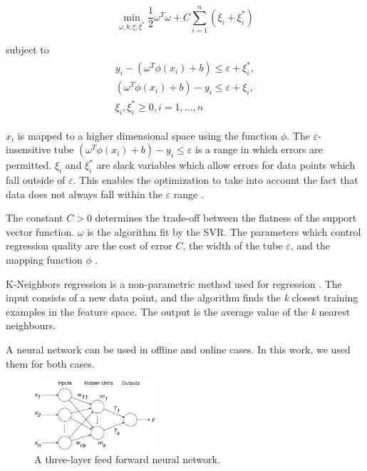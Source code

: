 \documentclass[final,3p,times,twocolumn,numbers]{elsarticle}
\begin{document}
\begin{equation}
\min_{\omega,b,\xi,\xi^{*}}\frac{1}{2}\omega^T\omega+C\sum_{i=1}^{n}(\xi_i+\xi_i^*)
\end{equation}

\noindent subject to
\begin{align}
\begin{multlined}
\label{svr:constrains}
y_i-(\omega^T\phi(x_i)+b)\leq\varepsilon+\xi_i^{*},\\
(\omega^T\phi(x_i)+b)-y_i\leq\varepsilon+\xi_i,\\
\xi_i,\xi^*_i\geq0,i=1,\ldots,n
\end{multlined}
\end{align}

\noindent $x_i$ is mapped to a higher dimensional space using the function $\phi$. The $\varepsilon$-insensitive tube $(\omega^T\phi(x_i)+b)-y_i\leq\varepsilon$ is a range in which errors are permitted. $\xi_i$ and $\xi^*_i$ are slack variables which allow errors for data points which fall outside of $\varepsilon$. This enables the optimization to take into account the fact that data does not always fall within the $\varepsilon$ range \cite{Smola2004}.

The constant $C>0$ determines the trade-off between the flatness of the support vector function. $\omega$ is the algorithm fit by the SVR. The parameters which control regression quality are the cost of error $C$, the width of the tube $\varepsilon$, and the mapping function $\phi$ \cite{Shu2006,Chen2004}. 


 K-Neighbors regression is a non-parametric method used for regression \cite{forgy65}. The input consists of a new data point, and the algorithm finds the \textit{k} closest training examples in the feature space. The output is the average value of the \textit{k} nearest neighbours.



 A neural network can be used in offline and online cases. In this work, we used them for both cases.


\begin{figure}
\centering
    \includegraphics[width=0.4\textwidth]{figures/methods/Kell_eEnergy_Fig1.eps}
    \caption{A three-layer feed forward neural network.}
    \label{fig:mlp}
\end{figure}
\end{document}
